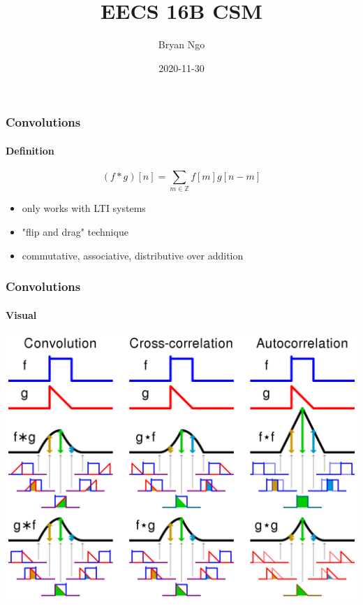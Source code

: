 \documentclass[aspectratio=169]{beamer}
\title{EECS 16B CSM}
\author{Bryan Ngo}
\date{2020-11-30}
\institute{UC Berkeley}
\newcommand{\Z}{\mathbb{Z}}
\begin{document}
\begin{frame}
    \maketitle
\end{frame}

\begin{frame}
    \frametitle{Convolutions}
    \framesubtitle{Definition}

    \begin{equation}
        (f \ast g)[n] = \sum_{m \in \Z} f[m] g[n - m]
    \end{equation}
    \begin{itemize}
        \item only works with LTI systems
        \item "flip and drag" technique
        \item commutative, associative, distributive over addition
    \end{itemize}
\end{frame}

\begin{frame}
    \frametitle{Convolutions}
    \framesubtitle{Visual}

    \begin{center}
        \includegraphics[height=0.8\textheight]{Comparison_convolution_correlation.svg.png}
    \end{center}
\end{frame}
\end{document}
